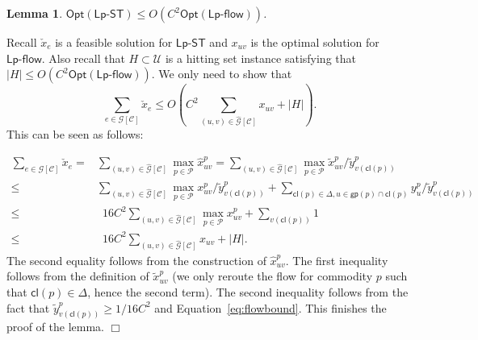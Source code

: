 \documentclass[11pt]{article}
\newcommand{\calC}{{\mathcal C}}
\newcommand{\calP}{{\mathcal P}}
\newcommand{\calG}{{\mathcal G}}
\newcommand{\calU}{{\mathcal U}}
\newcommand{\opt}{\mathsf{Opt}}
\newcommand{\hx}{\widehat{x}}
\newcommand{\tx}{\widetilde{x}}
\newcommand{\ty}{\widetilde{y}}
\newcommand{\lpflow}{\mathsf{Lp}\text{-}\mathsf{flow}}
\newcommand{\lpsteiner}{\mathsf{Lp}\text{-}\mathsf{ST}}
\newcommand{\group}{\mathsf{gp}}
\newcommand{\cell}{\mathsf{cl}}
\newcommand{\setcell}{\mathsf{\Delta}}
\newenvironment{proof}{\noindent {\em Proof: }\ignorespaces}{}
\newcommand{\qed}{\hspace*{\fill}$\Box$\medskip}
\newtheorem{lemma}{Lemma}
\begin{document}
\begin{lemma}
	\label{lm:steiner}
	$\opt(\lpsteiner)\leq O(C^2 \opt(\lpflow))$.
\end{lemma}
\begin{proof}
	Recall $\check{x}_{e}$ is a feasible solution for $\lpsteiner$ and $x_{uv}$ is the optimal solution for $\lpflow$. Also recall that $H\subset \calU$ is a hitting set instance satisfying that $|H|\leq O(C^2\opt(\lpflow))$.
	We only need to show that 
	$$
	\sum_{e\in \calG[\calC]} \check{x}_{e} \leq O(C^2\sum_{(u,v)\in \widehat{\calG}[\calC]} x_{uv} + |H|).
	$$
	This can be seen as follows:
	
	
	\begin{align*}
	\sum_{e\in \calG[\calC]} \check{x}_{e} = &\sum_{(u,v)\in \widehat{\calG}[\calC]} \max_{p\in \calP}\hx^p_{uv}
	= \sum_{(u,v)\in \widehat{\calG}[\calC]} \max_{p\in \calP}\tx^p_{uv}/\ty^p_{v(\cell(p))} \\
	\leq & \sum_{(u,v)\in \widehat{\calG}[\calC]}  \max_{p\in \calP} x^p_{uv}/ \ty^p_{v(\cell(p))} +\sum_{\cell(p) \in \setcell, u\in \group(p)\cap\cell(p)} y^p_{u}/\ty^p_{v(\cell(p))} \\
	\leq & \,\,\, 16C^2 \sum_{(u,v)\in \widehat{\calG}[\calC]}  \max_{p\in \calP} x^p_{uv} +\sum_{v(\cell(p))} 1 \\ 
	\leq &\,\,\, 16C^2 \sum_{(u,v)\in \widehat{\calG}[\calC]} x_{uv}+ |H|. \end{align*}
	The second equality follows from the construction of $\hx^p_{uv}$. The first inequality follows from the definition of $\tx^p_{uv}$ (we only reroute the flow for commodity $p$ such that $\cell(p)\in \setcell$, hence the second term). The second inequality follows from the fact that $\ty^p_{v(\cell(p))}\geq 1/16C^2$ and Equation~\eqref{eq:flowbound}.
	This finishes the proof of the lemma.
	\qed
\end{proof}
\end{document}
